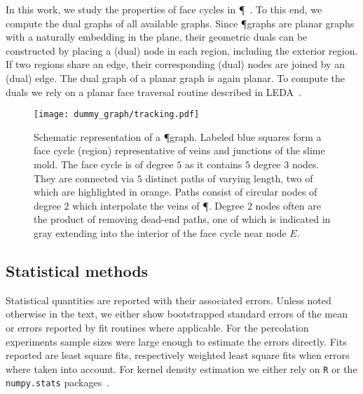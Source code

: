 		In this work, we study the properties of face cycles in \P~\cite{mehlhorn1995leda}. To this end, we compute the dual graphs of all available graphs. Since \P graphs are planar graphs with a naturally embedding in the plane, their geometric duals can be constructed by placing a (dual) node in each region, including the exterior region. If two regions share an edge, their corresponding (dual) nodes are joined by an (dual) edge. The dual graph of a planar graph is again planar. To compute the duals we rely on a planar face traversal routine described in LEDA~\cite{mehlhorn1995leda}.

		\begin{figure}[!htbp]
			\centering
			
			\texttt{[image: dummy\_graph/tracking.pdf]}

			\caption[Graph representation of a \P graph]{Schematic representation of a \P graph. Labeled blue squares form a face cycle (region) representative of veins and junctions of the slime mold. The face cycle is of degree $5$ as it contains $5$ degree $3$ nodes. They are connected via $5$ distinct paths of varying length, two of which are highlighted in orange. Paths consist of circular nodes of degree $2$ which interpolate the veins of \P. Degree $2$ nodes often are the product of removing dead-end paths, one of which is indicated in gray extending into the interior of the face cycle near node $E$.}
			\label{fig:graph_schematic}
		\end{figure}

	\subsection{Statistical methods}

		Statistical quantities are reported with their associated errors. Unless noted otherwise in the text, we either show bootstrapped standard errors of the mean or errors reported by fit routines where applicable. For the percolation experiments sample sizes were large enough to estimate the errors directly. Fits reported are least square fits, respectively weighted least square fits when errors where taken into account. For kernel density estimation we either rely on \verb+R+ or the \verb+numpy.stats+ packages~\cite{team2013r,jones2001open}.

